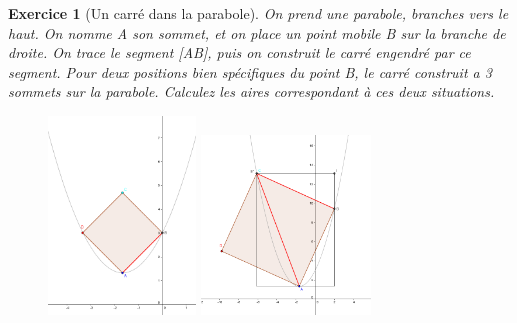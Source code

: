 \documentclass[12pt]{article}
\theoremstyle{break}
\newtheorem{exo}{Exercice}
\begin{document}
\begin{exo}[Un carré dans la parabole]
On prend une parabole, branches vers le haut. On nomme A son sommet, et on place un point mobile B sur la branche de droite. On trace le segment [AB], puis on construit le carré engendré par ce segment. Pour deux positions bien spécifiques du point B, le carré construit a 3 sommets sur la parabole. Calculez les aires correspondant à ces deux situations.


\begin{figure}[h!]
	\centering
    \includegraphics[width=0.35\textwidth]{images/CarreParabole.png}
    \includegraphics[width=0.4\textwidth]{images/CarreParabole2.png}
\end{figure}
\end{exo}
\end{document}
